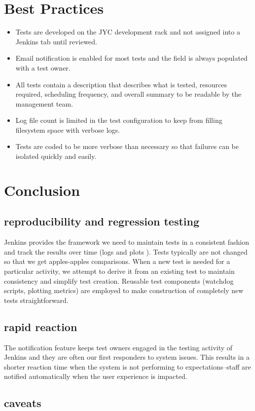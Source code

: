 \documentclass[10pt, conference, compsocconf]{IEEEtran}
\begin{document}
\section{Best Practices}
\begin{itemize}
\item Tests are developed on the JYC development rack and not assigned into a Jenkins tab until reviewed.
\item Email notification is enabled for most tests and the field is always populated with a test owner.
\item All tests contain a description that describes what is tested, resources required, scheduling frequency, and overall summary  to be readable by the management team.
\item Log file count is limited in the test configuration to keep from filling filesystem space with verbose logs.
\item Tests are coded to be more verbose than necessary so that failures can be isolated quickly and easily.
\end{itemize}

\section{Conclusion}
\subsection{reproducibility and regression testing}
Jenkins provides the framework we need to maintain tests in a consistent fashion and track the results over time (logs and plots ).  Tests typically are not changed so that we get apples-apples comparisons.  When a new test is needed for a particular activity, we attempt to derive it from an existing test to maintain consistency and simplify test creation.  Reusable test components (watchdog scripts, plotting metrics) are employed to make construction of completely new tests straightforward.
\subsection{rapid reaction}
The notification feature keeps test owners engaged in the testing activity of Jenkins and they are often our first responders to system issues.  This results in a shorter reaction time when the system is not performing to expectations--staff are notified automatically when the user experience is impacted.
\subsection{caveats}
\end{document}
